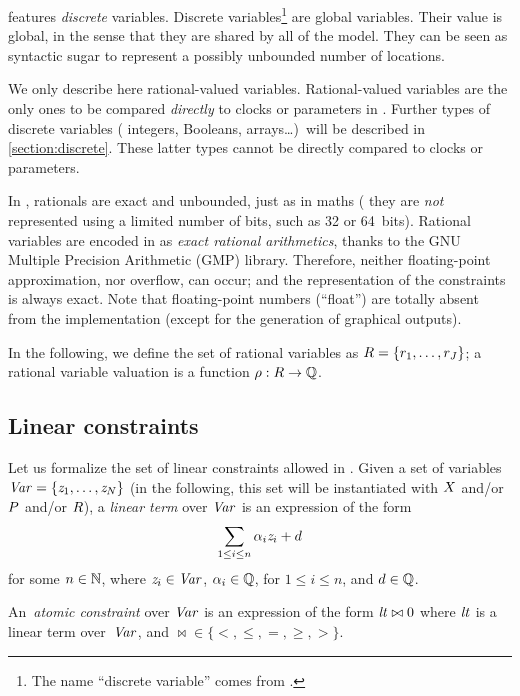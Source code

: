 \imitator{} features \emph{discrete} variables.
%
Discrete variables\footnote{%
	The name ``discrete variable'' comes from \hytech{}.
}
are global variables.
Their value is global, in the sense that they are shared by all \IPTA{} of the model.
They can be seen as syntactic sugar to represent a possibly unbounded number of locations.

We only describe here rational-valued variables.
Rational-valued variables are the only ones to be compared \emph{directly} to clocks or parameters in \imitator{}.
Further types of discrete variables (\eg{} integers, Booleans, arrays…)\ will be described in \cref{section:discrete}.
These latter types cannot be directly compared to clocks or parameters.

In \imitator{}, rationals are exact and unbounded, just as in maths (\ie{} they are \emph{not} represented using a limited number of bits, such as 32 or 64~bits).
%
Rational variables are encoded in \imitator{} as \emph{exact rational arithmetics}, thanks to the GNU Multiple Precision Arithmetic (GMP) library.
Therefore, neither floating-point approximation, nor overflow, can occur;
%
and the representation of the constraints is always exact.
Note that floating-point numbers (``float'') are totally absent from the \imitator{} implementation (except for the generation of graphical outputs).

In the following, we define the set of rational variables as $R = \{ r_1, \dots, r_J \} $;
a rational variable valuation is a function $\rho : R \rightarrow \mathbb Q$.



\subsection{Linear constraints}\label{ss:constraints}

Let us formalize the set of linear constraints allowed in \imitator{}.
Given a set of variables~$\mathit{Var} = \{ \mathit{z}_1, \dots, \mathit{z}_N \}$ (in the following, this set will be instantiated with $X$ and/or $P$ and/or $R$), a \emph{linear term} over $\mathit{Var}$ is an expression of the form
$$
	\sum_{1 \leq i \leq n} \alpha_i \mathit{z}_i + d
$$
for some $n \in \mathbb N$,
where
$\mathit{z}_{i} \in \mathit{Var}$,
$\alpha_{i} \in \mathbb Q$, for $1 \leq i \leq n$,
and
$d \in \mathbb Q$.

An~\emph{atomic constraint} over $\mathit{Var}$ is an expression of the form
$
	\mathit{lt} \bowtie 0
$
where
$\mathit{lt}$ is a linear term over~$\mathit{Var}$,
and
${\bowtie} \in \{ <, \leq, =, \geq, > \}$.

